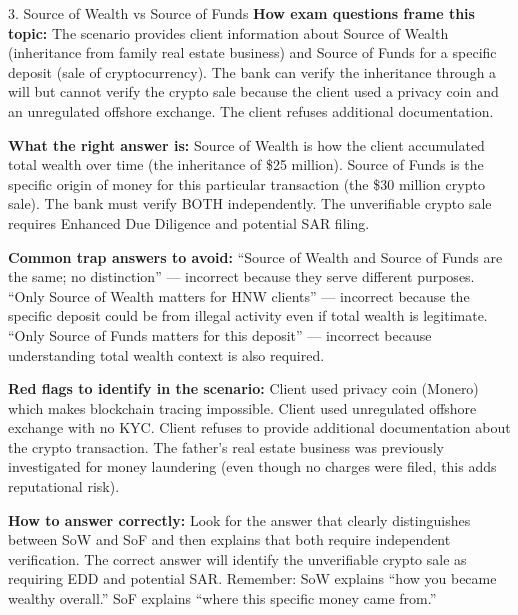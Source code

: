 \documentclass[11pt,a4paper]{beamer}
\begin{document}
	\begin{frame}{3. Source of Wealth vs Source of Funds}
		\tiny
		\noindent\textbf{How exam questions frame this topic:} The scenario provides client information about Source of Wealth (inheritance from family real estate business) and Source of Funds for a specific deposit (sale of cryptocurrency). The bank can verify the inheritance through a will but cannot verify the crypto sale because the client used a privacy coin and an unregulated offshore exchange. The client refuses additional documentation.
		
		\vspace{0.1cm}
		\noindent\textbf{What the right answer is:} Source of Wealth is how the client accumulated total wealth over time (the inheritance of \$25 million). Source of Funds is the specific origin of money for this particular transaction (the \$30 million crypto sale). The bank must verify BOTH independently. The unverifiable crypto sale requires Enhanced Due Diligence and potential SAR filing.
		
		\vspace{0.1cm}
		\noindent\textbf{Common trap answers to avoid:} “Source of Wealth and Source of Funds are the same; no distinction” — incorrect because they serve different purposes. “Only Source of Wealth matters for HNW clients” — incorrect because the specific deposit could be from illegal activity even if total wealth is legitimate. “Only Source of Funds matters for this deposit” — incorrect because understanding total wealth context is also required.
		
		\vspace{0.1cm}
		\noindent\textbf{Red flags to identify in the scenario:} Client used privacy coin (Monero) which makes blockchain tracing impossible. Client used unregulated offshore exchange with no KYC. Client refuses to provide additional documentation about the crypto transaction. The father's real estate business was previously investigated for money laundering (even though no charges were filed, this adds reputational risk).
		
		\vspace{0.1cm}
		\noindent\textbf{How to answer correctly:} Look for the answer that clearly distinguishes between SoW and SoF and then explains that both require independent verification. The correct answer will identify the unverifiable crypto sale as requiring EDD and potential SAR. Remember: SoW explains “how you became wealthy overall.” SoF explains “where this specific money came from.”
	\end{frame}
	
\end{document}
